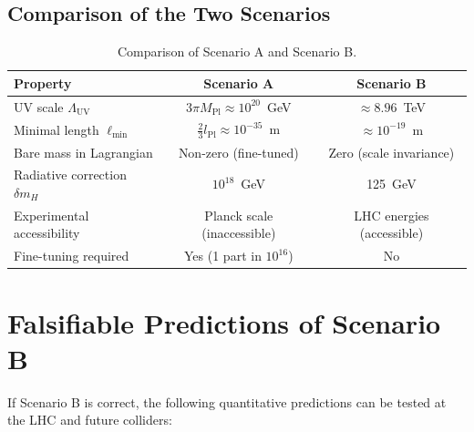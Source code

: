 \documentclass[12pt,a4paper]{article}
\newcommand{\Mpl}{M_{\mathrm{Pl}}}
\newcommand{\Lpl}{l_{\mathrm{Pl}}}
\newcommand{\Lmin}{\ell_{\min}}
\newcommand{\LUV}{\Lambda_{\mathrm{UV}}}
\theoremstyle{remark}
\begin{document}
	\subsection{Comparison of the Two Scenarios}
	
	\begin{table}[H]
		\centering
		\caption{Comparison of Scenario A and Scenario B.}
		\label{tab:scenarios}
		\small
		\begin{tabular}{@{}lcc@{}}
			\toprule
			\textbf{Property} & \textbf{Scenario A} & \textbf{Scenario B} \\
			\midrule
			UV scale \(\LUV\) & \(3\pi\Mpl \approx 10^{20}\)~GeV & \(\approx 8.96\)~TeV \\
			Minimal length \(\Lmin\) & \(\frac{2}{3}\Lpl \approx 10^{-35}\)~m & \(\approx 10^{-19}\)~m \\
			Bare mass in Lagrangian & Non-zero (fine-tuned) & Zero (scale invariance) \\
			Radiative correction \(\delta m_H\) & \(10^{18}\)~GeV & 125~GeV \\
			Experimental accessibility & Planck scale (inaccessible) & LHC energies (accessible) \\
			Fine-tuning required & Yes (1 part in \(10^{16}\)) & No \\
			\bottomrule
		\end{tabular}
	\end{table}
	
	\section{Falsifiable Predictions of Scenario B}
	\label{sec:predictions}
	
	If Scenario B is correct, the following quantitative predictions can be tested at the LHC and future colliders:
	
\end{document}
